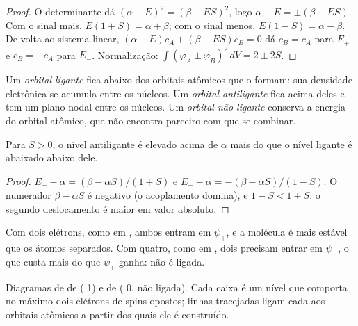 \begin{proof}
O determinante dá $(\alpha - E)^2 = (\beta - ES)^2$, logo $\alpha - E = \pm(\beta - ES)$.
Com o sinal mais, $E(1 + S) = \alpha + \beta$; com o sinal menos, $E(1 - S) = \alpha
- \beta$. De volta ao sistema linear, $(\alpha - E)c_A + (\beta - ES)c_B = 0$ dá $c_B
= c_A$ para $E_+$ e $c_B = -c_A$ para $E_-$. Normalização: $\int(\varphi_A \pm
\varphi_B)^2\,dV = 2 \pm 2S$.
\end{proof}

\begin{definition}\label{def:b2:diatomic-mos:bonding}
Um \emph{orbital ligante} fica abaixo dos orbitais
atômicos que o formam: sua densidade eletrônica se acumula entre os núcleos.
Um \emph{orbital antiligante} fica acima deles e
tem um plano nodal entre os núcleos. Um \emph{orbital não ligante}
conserva a energia do orbital atômico, que não encontra parceiro com que se
combinar.
\end{definition}

\begin{proposition}\label{prop:b2:diatomic-mos:asymmetry}
Para $S > 0$, o nível antiligante é elevado acima de $\alpha$ mais do que o
nível ligante é abaixado abaixo dele.
\end{proposition}

\begin{proof}
$E_+ - \alpha = (\beta - \alpha S)/(1 + S)$ e $E_- - \alpha = -(\beta - \alpha S)/(1 - S)$.
O numerador $\beta - \alpha S$ é negativo (o acoplamento domina), e $1 - S < 1
+ S$: o segundo deslocamento é maior em valor absoluto.
\end{proof}

Com dois elétrons, como em , ambos entram em $\psi_+$, e a molécula é
mais estável que os átomos separados. Com quatro, como em , dois
precisam entrar em $\psi_-$, o que custa mais do que $\psi_+$ ganha: 
não é ligada.

\begin{omfigure}
\begin{MOdiagram}
\end{MOdiagram}
\hspace{1.5cm}
\begin{MOdiagram}
\end{MOdiagram}

{\small Diagramas de  de  ( 1) e de
 ( 0, não ligada). Cada caixa é um nível que comporta no
máximo dois elétrons de spins opostos; linhas tracejadas ligam cada  aos orbitais atômicos a partir dos quais ele é construído.}
\end{omfigure}

